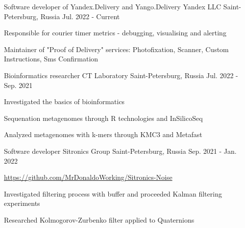 

\begin{cventries}

  \cventry
    {Software developer of Yandex.Delivery and Yango.Delivery} %
    {Yandex LLC} %
    {Saint-Petersburg, Russia} %
    {Jul. 2022 - Current} %
    {
      \begin{cvitems} %
        \item {Responsible for courier timer metrics - debugging, visualising and alerting}
        \item {Maintainer of "Proof of Delivery" services: Photofixation, Scanner, Custom Instructions, Sms Confirmation}
      \end{cvitems}
    }

  \cventry
    {Bioinformatics researcher} %
    {CT Laboratory} %
    {Saint-Petersburg, Russia} %
    {Jul. 2022 - Sep. 2021} %
    {
      \begin{cvitems} %
        \item {Investigated the basics of bioinformatics}
        \item {Sequenation metagenomes through R technologies and InSilicoSeq}
        \item {Analyzed metagenomes with k-mers through KMC3 and Metafast}
      \end{cvitems}
    }

  \cventry
    {Software developer} %
    {Sitronics Group} %
    {Saint-Petersburg, Russia} %
    {Sep. 2021 - Jan. 2022} %
    {
      \begin{cvitems} %
        \item{\url{https://github.com/MrDonaldoWorking/Sitronics-Noise}}
        \item {Investigated filtering process with buffer and proceeded Kalman filtering experiments}
        \item {Researched Kolmogorov-Zurbenko filter applied to Quaternions}
      \end{cvitems}
    }

\end{cventries}
